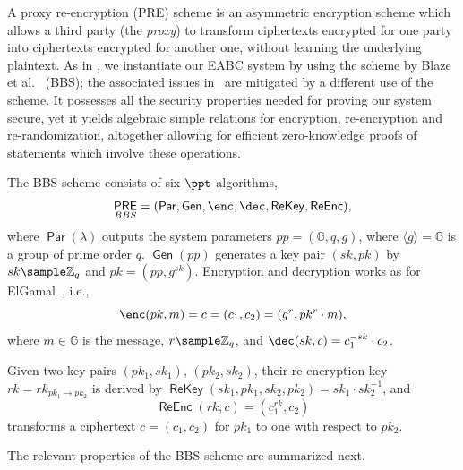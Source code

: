 \documentclass[runningheads]{llncs}
\newcommand{\Z}{\mathbb{Z}}
\DeclareMathOperator{\PRE}{\ensuremath{\mathsf{PRE}}}
\DeclareMathOperator{\param}{\mathsf{Par}}
\DeclareMathOperator{\gen}{\mathsf{Gen}}
\DeclareMathOperator{\rekey}{\mathsf{ReKey}}
\DeclareMathOperator{\reenc}{\mathsf{ReEnc}}
\begin{document}
A proxy re-encryption (PRE) scheme is an asymmetric encryption scheme which allows a third party (the \emph{proxy}) to transform ciphertexts encrypted for one party into ciphertexts encrypted  for another one, without learning the underlying plaintext.
As in \cite{towardsEABC},  we instantiate our EABC system by using the scheme by Blaze et al.~\cite{BBS} (BBS);
the associated issues in~\cite{towardsEABC} are mitigated by a different use of the scheme.
It possesses all the security properties needed for proving our system secure, yet it yields algebraic simple relations for encryption, re-encryption and re-randomization, altogether allowing for efficient zero-knowledge proofs of statements which involve these operations.

The BBS scheme consists of six $\ppt$ algorithms,
\[
 \PRE_{BBS} = (\param, \gen, \enc, \dec, \rekey,\reenc),
\]
where $\param(\lambda)$ outputs the system parameters $pp= (\mathbb G, q, g)$, where $\langle g\rangle=\mathbb G$ is a group of prime order $q$.
$\gen(pp)$ generates a key pair $(sk,pk)$ by $sk\sample\Z_q$ and $pk=(pp, g^{sk})$.
Encryption and decryption works as for ElGamal~\cite{DBLP:conf/crypto/Gamal84}, i.e., 
\[
\enc(pk, m) = c =  (c_1,c_2) = (g^r, pk^r \cdot m),
\] 
where $m\in\mathbb G$ is the message, $r\sample\Z_q$, and $\dec(sk, c) = c_1^{-sk}\cdot c_2$.

Given two key pairs $(pk_1,sk_1)$, $(pk_2,sk_2)$, their re-encryption key $rk=rk_{pk_1\rightarrow pk_2}$ is derived by $\rekey(sk_1,pk_1, sk_2,pk_2) =sk_1\cdot sk_2^{-1}$, and 
\[
\reenc(rk,c) = (c_1^{rk}, c_2)
\] 
transforms a ciphertext $c=(c_1,c_2)$ for $pk_1$ to one with respect to $pk_2$. 
\medskip

The relevant properties of the BBS scheme are summarized next.
\end{document}
